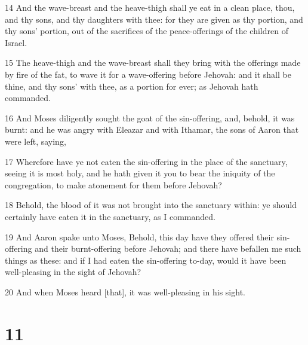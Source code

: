 \par 14 And the wave-breast and the heave-thigh shall ye eat in a clean place, thou, and thy sons, and thy daughters with thee: for they are given as thy portion, and thy sons' portion, out of the sacrifices of the peace-offerings of the children of Israel.
\par 15 The heave-thigh and the wave-breast shall they bring with the offerings made by fire of the fat, to wave it for a wave-offering before Jehovah: and it shall be thine, and thy sons' with thee, as a portion for ever; as Jehovah hath commanded.
\par 16 And Moses diligently sought the goat of the sin-offering, and, behold, it was burnt: and he was angry with Eleazar and with Ithamar, the sons of Aaron that were left, saying,
\par 17 Wherefore have ye not eaten the sin-offering in the place of the sanctuary, seeing it is most holy, and he hath given it you to bear the iniquity of the congregation, to make atonement for them before Jehovah?
\par 18 Behold, the blood of it was not brought into the sanctuary within: ye should certainly have eaten it in the sanctuary, as I commanded.
\par 19 And Aaron spake unto Moses, Behold, this day have they offered their sin-offering and their burnt-offering before Jehovah; and there have befallen me such things as these: and if I had eaten the sin-offering to-day, would it have been well-pleasing in the sight of Jehovah?
\par 20 And when Moses heard [that], it was well-pleasing in his sight.

\chapter{11}


